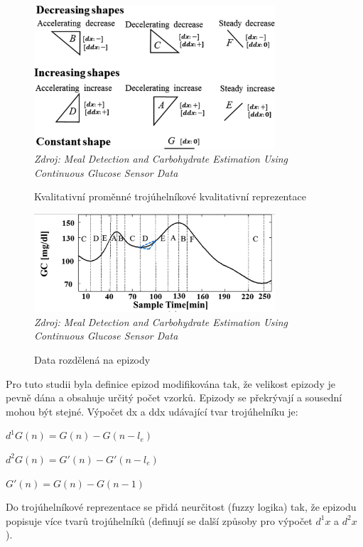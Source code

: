 \begin{figure}[H]
\caption{Kvalitativní proměnné trojúhelníkové kvalitativní reprezentace}
\label{fig:wavelet1}
\centering
\includegraphics[width=0.8\textwidth]{img/analyza/wavelet1.png}\\
\textit{Zdroj: Meal Detection and Carbohydrate Estimation Using Continuous Glucose Sensor Data \citep{Analyza.WaveletEst}}
\end{figure}
\begin{figure}[H]
\caption{Data rozdělená na epizody}
\label{fig:wavelet2}
\centering
\includegraphics[width=0.8\textwidth]{img/analyza/wavelet2.png}\\
\textit{Zdroj: Meal Detection and Carbohydrate Estimation Using Continuous Glucose Sensor Data \citep{Analyza.WaveletEst}}
\end{figure}

Pro tuto studii byla definice epizod modifikována tak, že velikost epizody je pevně dána a obsahuje určitý počet vzorků. Epizody se překrývají a sousední mohou být stejné. Výpočet dx a ddx udávající tvar trojúhelníku je:

$d^{1}G(n)=G(n)-G(n-l_{e})$

$d^{2}G(n)=G'(n)-G'(n-l_{e})$

$G'(n)=G(n)-G(n-1)$

Do trojúhelníkové reprezentace se přidá neurčitost (fuzzy logika) tak, že epizodu popisuje více tvarů trojúhelníků (definují se další způsoby pro výpočet $d^1x$ a $d^2x$).

